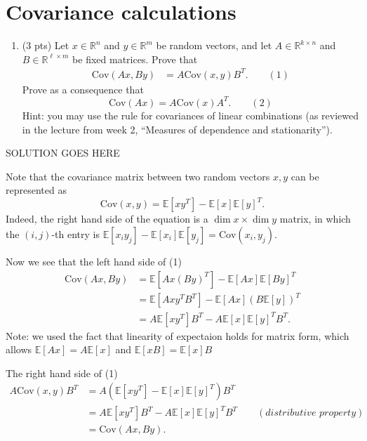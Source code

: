 \documentclass[
]{article}
\providecommand{\tightlist}{%
  \setlength{\itemsep}{0pt}\setlength{\parskip}{0pt}}
\begin{document}
\hypertarget{covariance-calculations}{%
\section{Covariance calculations}\label{covariance-calculations}}

\begin{enumerate}
\def\labelenumi{\arabic{enumi}.}
\setcounter{enumi}{8}
\tightlist
\item
  (3 pts) Let \(x \in \mathbb{R}^n\) and \(y \in \mathbb{R}^m\) be
  random vectors, and let \(A \in \mathbb{R}^{k \times n}\) and
  \(B \in \mathbb{R}^{\ell \times m}\) be fixed matrices. Prove that
  \begin{align}
  \mathrm{Cov}(Ax, By) & = A \mathrm{Cov}(x, y) B^T. \qquad (1)
  \end{align} Prove as a consequence that
  \[\mathrm{Cov}(Ax) = A \mathrm{Cov}(x) A^T.\qquad (2)\] Hint: you may
  use the rule for covariances of linear combinations (as reviewed in
  the lecture from week 2, ``Measures of dependence and stationarity'').
\end{enumerate}

SOLUTION GOES HERE

Note that the covariance matrix between two random vectors \(x,y\) can
be represented as
\[\mathrm{Cov}(x,y) = \mathbb{E}\left[xy^T\right] - \mathbb{E}\left[x\right]\mathbb{E}\left[y\right]^T.\]
Indeed, the right hand side of the equation is a
\(\dim x \times \dim y\) matrix, in which the \((i,j)\)-th entry is
\(\mathbb{E}[x_iy_j] - \mathbb{E}[x_i]\mathbb{E}[y_j]=\mathrm{Cov}(x_i,y_j)\).

Now we see that the left hand side of (1) \begin{align*}
    \mathrm{Cov}(Ax, By) & = \mathbb{E}\left[Ax(By)^T\right] - \mathbb{E}[Ax]\mathbb{E}[By]^T \\
    & = \mathbb{E}\left[Axy^TB^T\right] - \mathbb{E}[Ax]\left(B\mathbb{E}[y]\right)^T \\
    & = A\mathbb{E}\left[xy^T\right]B^T - A\mathbb{E}[x]\mathbb{E}[y]^TB^T.
\end{align*} Note: we used the fact that linearity of expectaion holds
for matrix form, which allows \(\mathbb{E}[Ax] = A\mathbb{E}[x]\) and
\(\mathbb{E}[xB] = \mathbb{E}[x]B\)

The right hand side of (1) \begin{align*}
    A\mathrm{Cov}(x,y)B^T & = A\left(\mathbb{E}\left[xy^T\right] - \mathbb{E}[x]\mathbb{E}[y]^T\right)B^T \\
    & = A\mathbb{E}\left[xy^T\right]B^T - A\mathbb{E}[x]\mathbb{E}[y]^TB^T \qquad (\textit{distributive property}) \\
    & = \mathrm{Cov}(Ax, By).
\end{align*}
\end{document}
